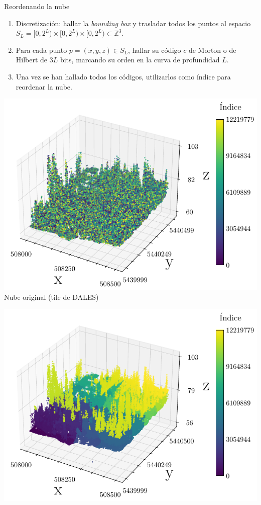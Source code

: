 \documentclass[aspectratio=169]{beamer}
\begin{document}
\begin{frame}{Reordenando la nube}
    \begin{enumerate}
        \item Discretización: hallar la \textit{bounding box} y trasladar todos los puntos al espacio $S_L = [0,2^L) \times [0, 2^L) \times [0, 2^L) \subset \mathbb{Z}^3$.
        \item Para cada punto $p =(x,y,z) \in S_L$, hallar su código $c$ de Morton o de Hilbert de $3L$ bits, marcando su orden en la curva de profundidad $L$.
        \item Una vez se han hallado todos los códigos, utilizarlos como índice para reordenar la nube.
    \end{enumerate}
    \vspace{1em}
    \begin{center}
        \begin{minipage}{0.32\textwidth}
            \centering
            \includegraphics[width=\linewidth]{img/plot_5080-54400_unencoded.pdf} \\
            \footnotesize Nube original (tile de DALES)
        \end{minipage}
        \hfill
        \begin{minipage}{0.32\textwidth}
            \centering
            \includegraphics[width=\linewidth]{img/plot_5080-54400_morton.pdf} \\

\end{minipage}
\end{center}
\end{frame}
\end{document}
